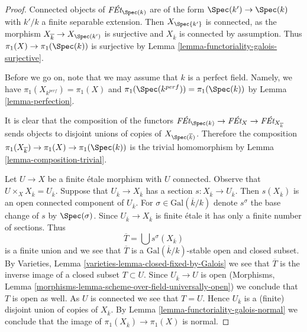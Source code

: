 \begin{proof}
Connected objects of $\textit{F\'Et}_{\Spec(k)}$ are of the form
$\Spec(k') \to \Spec(k)$ with $k'/k$ a finite separable extension.
Then $X_{\Spec{k'}}$ is connected, as the morphism
$X_{\overline{k}} \to X_{\Spec(k')}$ is surjective and
$X_{\overline{k}}$ is connected by assumption. Thus
$\pi_1(X) \to \pi_1(\Spec(k))$ is surjective by
Lemma \ref{lemma-functoriality-galois-surjective}.

\medskip\noindent
Before we go on, note that we may assume that $k$ is a perfect field.
Namely, we have $\pi_1(X_{k^{perf}}) = \pi_1(X)$ and
$\pi_1(\Spec(k^{perf})) = \pi_1(\Spec(k))$ by Lemma \ref{lemma-perfection}.

\medskip\noindent
It is clear that the composition of the functors
$\textit{F\'Et}_{\Spec(k)} \to \textit{F\'Et}_X \to
\textit{F\'Et}_{X_{\overline{k}}}$ sends objects to disjoint unions
of copies of $X_{\Spec(\overline{k})}$. Therefore the composition
$\pi_1(X_{\overline{k}}) \to \pi_1(X) \to \pi_1(\Spec(k))$
is the trivial homomorphism by Lemma \ref{lemma-composition-trivial}.

\medskip\noindent
Let $U \to X$ be a finite \'etale morphism with $U$ connected.
Observe that $U \times_X X_{\overline{k}} = U_{\overline{k}}$.
Suppose that $U_{\overline{k}} \to X_{\overline{k}}$
has a section $s : X_{\overline{k}} \to U_{\overline{k}}$.
Then $s(X_{\overline{k}})$ is an open connected component of
$U_{\overline{k}}$. For $\sigma \in \text{Gal}(\overline{k}/k)$
denote $s^\sigma$ the base change of $s$ by $\Spec(\sigma)$.
Since $U_{\overline{k}} \to X_{\overline{k}}$ is finite \'etale
it has only a finite number of sections. Thus
$$
\overline{T} = \bigcup s^\sigma(X_{\overline{k}})
$$
is a finite union and we see that $\overline{T}$ is a
$\text{Gal}(\overline{k}/k)$-stable open and closed subset.
By Varieties, Lemma \ref{varieties-lemma-closed-fixed-by-Galois}
we see that $\overline{T}$ is the inverse image of a closed
subset $T \subset U$. Since $U_{\overline{k}} \to U$ is open
(Morphisms, Lemma \ref{morphisms-lemma-scheme-over-field-universally-open})
we conclude that $T$ is open as well. As $U$ is connected we
see that $T = U$. Hence $U_{\overline{k}}$ is a (finite) disjoint
union of copies of $X_{\overline{k}}$. By
Lemma \ref{lemma-functoriality-galois-normal} we conclude that the image of
$\pi_1(X_{\overline{k}}) \to \pi_1(X)$ is normal.


\end{proof}
